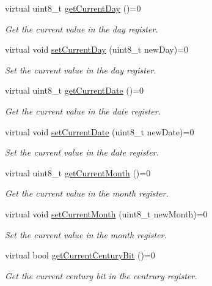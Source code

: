\begin{DoxyCompactItemize}
virtual uint8\+\_\+t \mbox{\hyperlink{classreal_time_clock_a13b8ebc25275f183a1117402fc9e5e36}{get\+Current\+Day}} ()=0
\begin{DoxyCompactList}\small\item\em Get the current value in the day register. \end{DoxyCompactList}\item 
virtual void \mbox{\hyperlink{classreal_time_clock_a4a80a695cbb55860921f92509fae0cd0}{set\+Current\+Day}} (uint8\+\_\+t new\+Day)=0
\begin{DoxyCompactList}\small\item\em Set the current value in the day register. \end{DoxyCompactList}\item 
virtual uint8\+\_\+t \mbox{\hyperlink{classreal_time_clock_a910bce5ee911c18bd34a4154953ce2ac}{get\+Current\+Date}} ()=0
\begin{DoxyCompactList}\small\item\em Get the current value in the date register. \end{DoxyCompactList}\item 
virtual void \mbox{\hyperlink{classreal_time_clock_a7db563a518ae7b87ca6d77860906e517}{set\+Current\+Date}} (uint8\+\_\+t new\+Date)=0
\begin{DoxyCompactList}\small\item\em Set the current value in the date register. \end{DoxyCompactList}\item 
virtual uint8\+\_\+t \mbox{\hyperlink{classreal_time_clock_a24dd15babb345129fd995641946c5f2b}{get\+Current\+Month}} ()=0
\begin{DoxyCompactList}\small\item\em Get the current value in the month register. \end{DoxyCompactList}\item 
virtual void \mbox{\hyperlink{classreal_time_clock_a2edeb084630a78309bc574eceaf5d6ae}{set\+Current\+Month}} (uint8\+\_\+t new\+Month)=0
\begin{DoxyCompactList}\small\item\em Set the current value in the month register. \end{DoxyCompactList}\item 
virtual bool \mbox{\hyperlink{classreal_time_clock_ae0b15649f9135be8f0d9ada65084c28f}{get\+Current\+Century\+Bit}} ()=0
\begin{DoxyCompactList}\small\item\em Get the current century bit in the centrury register. \end{DoxyCompactList}\item 

\end{DoxyCompactItemize}
